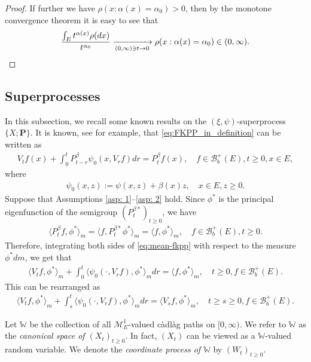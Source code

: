 \documentclass[12pt,a4paper]{amsart}
\theoremstyle{definition}
\numberwithin{equation}{section}
\begin{document}
\begin{proof}
	If further we have $\rho(x:\alpha(x) = \alpha_0)>0$, then by the monotone convergence theorem  it is easy to see that
  \begin{equation}
    \frac{\int_E t^{\alpha(x)} \rho(dx)}{t^{\alpha_0}}
    \xrightarrow[(0,\infty)\ni t\to 0]{} \rho(x:\alpha(x) = \alpha_0)\in (0,\infty).
    \qedhere
  \end{equation}
\end{proof}

\subsection{Superprocesses} \label{sec: Superprocesses}
In this subsection, we recall some known results on the $(\xi, \psi)$-superprocess $\{X; \mathbf P\}$.
It is known, see \cite[Theorem 2.23]{Li2011Measure-valued} for example, that \eqref{eq:FKPP_in_definition} can be written as
\begin{align}\label{eq:mean-fkpp}
	V_t f(x) + \int_0^t P^\beta_{t-r} \psi_0(x,V_r f) dr
	= P^\beta_t f(x),
	\quad f \in \mathscr B^+_b(E), t \geq 0,x \in E,
\end{align}
where
\begin{align}
	\psi_0(x,z)
	:= \psi(x,z) + \beta(x)z,
	\quad x \in E,z \geq 0.
\end{align}
Suppose that Assumptions \ref{asp: 1}--\ref{asp: 2} hold.
Since $\phi^*$ is the principal eigenfunction of the semigroup $(P_t^{\beta*})_{t\geq 0}$, we have
\begin{align}
  \langle P^\beta_{t} f, \phi^* \rangle_m
  = \langle f, P^{\beta*}_{t}\phi^* \rangle_m
  = \langle f, \phi^* \rangle_m,
  \quad f\in \mathscr B^+_b(E), t\geq 0.
\end{align}
Therefore, integrating both sides of \eqref{eq:mean-fkpp} with respect to the measure 
$\phi^*dm$, we get that
\begin{align}
  \langle V_tf,\phi^*\rangle_m + \int_0^t \langle \psi_0(\cdot ,V_r f) , \phi^*\rangle_mdr
  = \langle f,\phi^*\rangle_m,
  \quad t\geq 0, f\in \mathscr B^+_b(E).
\end{align}
This can be rearranged as
\begin{align}\label{eq:langleVtfphiranglem_equation}
  \langle V_tf,\phi^*\rangle_m + \int_s^t \langle \psi_0(\cdot ,V_r f) , \phi^*\rangle_mdr
  = \langle V_sf,\phi^*\rangle_m,
  \quad t\geq s\geq 0, f\in \mathscr B^+_b(E).
\end{align}

Let $\mathbb W$ be the collection of all $\mathcal M^1_E$-valued c\`{a}dl\`{a}g paths on $[0,\infty)$.
We refer to $\mathbb W$ as the \emph{canonical space of $(X_t)_{t\geq 0}$}.
In fact, $(X_t)$ can be viewed as a $\mathbb W$-valued random variable.
We denote the \emph{coordinate process of $\mathbb W$} by $(W_t)_{t\geq 0}$.
\end{document}
